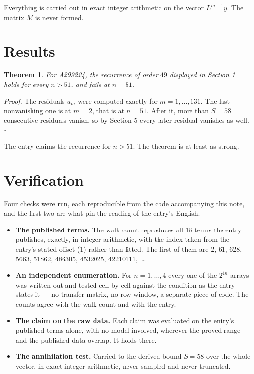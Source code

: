 \documentclass[11pt]{article}
\newtheorem{theorem}{Theorem}
\theoremstyle{definition}
\begin{document}
Everything is carried out in exact integer arithmetic on the vector $L^{m-1}y$. The matrix $M$ is never formed.

\section{Results}

\begin{theorem} For A299224, the recurrence of order $49$ displayed in Section 1 holds for every $n > 51$, and fails at $n = 51$.\end{theorem}

{\itshape Proof.} The residuals $u_m$ were computed exactly for $m = 1,\dots,131$. The last nonvanishing one is at $m = 2$, that is at $n = 51$. After it, more than $S = 58$ consecutive residuals vanish, so by Section 5 every later residual vanishes as well. $\square$

The entry claims the recurrence for $n > 51$. The theorem is at least as strong.

\section{Verification}

Four checks were run, each reproducible from the code accompanying this note, and the first two are what pin the reading of the entry's English.

\begin{itemize}

\item {\bfseries The published terms.} The walk count reproduces all 18 terms the entry publishes, exactly, in integer arithmetic, with the index taken from the entry's stated offset (1) rather than fitted. The first of them are 2, 61, 628, 5663, 51862, 486305, 4532025, 42210111,~\dots

\item {\bfseries An independent enumeration.} For $n = 1,\dots,4$ every one of the $2^{4n}$ arrays was written out and tested cell by cell against the condition as the entry states it --- no transfer matrix, no row window, a separate piece of code. The counts agree with the walk count and with the entry.

\item {\bfseries The claim on the raw data.} Each claim was evaluated on the entry's published terms alone, with no model involved, wherever the proved range and the published data overlap. It holds there.

\item {\bfseries The annihilation test.} Carried to the derived bound $S = 58$ over the whole vector, in exact integer arithmetic, never sampled and never truncated.

\end{itemize}
\end{document}
